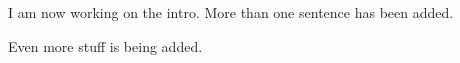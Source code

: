 I am now working on the intro. More than one sentence has been added.

Even more stuff is being added.